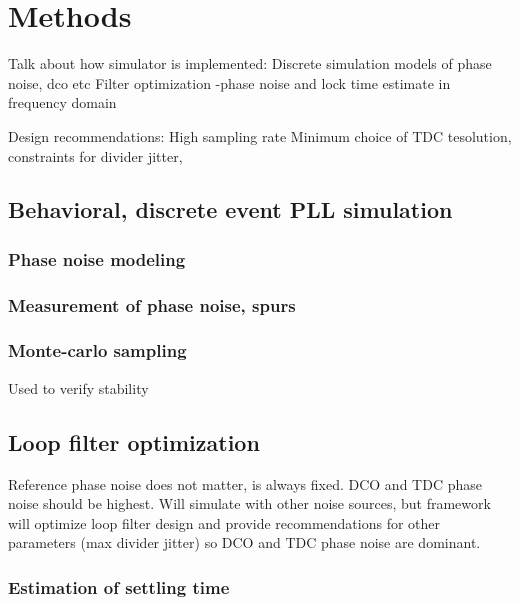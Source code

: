 \section{Methods}\label{methods}
Talk about how simulator is implemented:
Discrete simulation models of phase noise, dco etc
Filter optimization
-phase noise and lock time estimate in frequency domain

Design recommendations:
High sampling rate
Minimum choice of TDC tesolution, constraints for divider jitter, 
\subsection{Behavioral, discrete event PLL simulation}
\subsubsection{Phase noise modeling}
\subsubsection{Measurement of phase noise, spurs}
\subsubsection{Monte-carlo sampling}
Used to verify stability

\subsection{Loop filter optimization}
Reference phase noise does not matter, is always fixed.
DCO and TDC phase noise should be highest. Will simulate with other noise sources, but framework will optimize loop filter design and provide recommendations for other parameters (max divider jitter) so DCO and TDC phase noise are dominant.
\subsubsection{Estimation of settling time}


